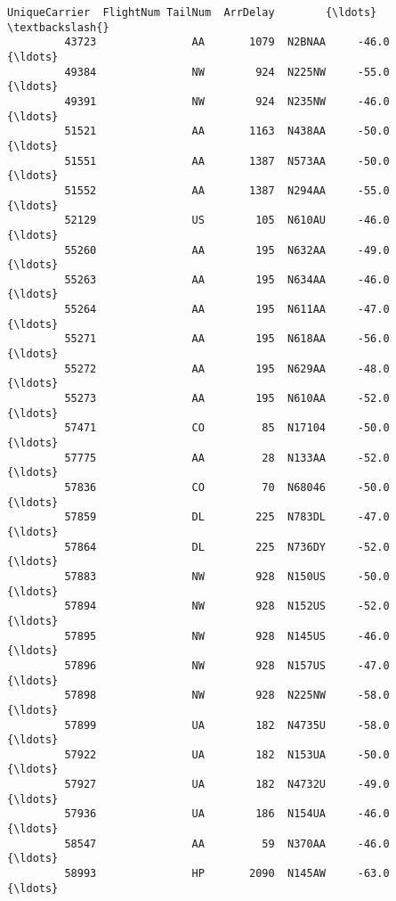 \documentclass[11pt]{article}
\begin{document}
\begin{Verbatim}[commandchars=\\\{\}]
                  UniqueCarrier  FlightNum TailNum  ArrDelay        {\ldots}          \textbackslash{}
         43723               AA       1079  N2BNAA     -46.0        {\ldots}           
         49384               NW        924  N225NW     -55.0        {\ldots}           
         49391               NW        924  N235NW     -46.0        {\ldots}           
         51521               AA       1163  N438AA     -50.0        {\ldots}           
         51551               AA       1387  N573AA     -50.0        {\ldots}           
         51552               AA       1387  N294AA     -55.0        {\ldots}           
         52129               US        105  N610AU     -46.0        {\ldots}           
         55260               AA        195  N632AA     -49.0        {\ldots}           
         55263               AA        195  N634AA     -46.0        {\ldots}           
         55264               AA        195  N611AA     -47.0        {\ldots}           
         55271               AA        195  N618AA     -56.0        {\ldots}           
         55272               AA        195  N629AA     -48.0        {\ldots}           
         55273               AA        195  N610AA     -52.0        {\ldots}           
         57471               CO         85  N17104     -50.0        {\ldots}           
         57775               AA         28  N133AA     -52.0        {\ldots}           
         57836               CO         70  N68046     -50.0        {\ldots}           
         57859               DL        225  N783DL     -47.0        {\ldots}           
         57864               DL        225  N736DY     -52.0        {\ldots}           
         57883               NW        928  N150US     -50.0        {\ldots}           
         57894               NW        928  N152US     -52.0        {\ldots}           
         57895               NW        928  N145US     -46.0        {\ldots}           
         57896               NW        928  N157US     -47.0        {\ldots}           
         57898               NW        928  N225NW     -58.0        {\ldots}           
         57899               UA        182  N4735U     -58.0        {\ldots}           
         57922               UA        182  N153UA     -50.0        {\ldots}           
         57927               UA        182  N4732U     -49.0        {\ldots}           
         57936               UA        186  N154UA     -46.0        {\ldots}           
         58547               AA         59  N370AA     -46.0        {\ldots}           
         58993               HP       2090  N145AW     -63.0        {\ldots}           

\end{Verbatim}
\end{document}
